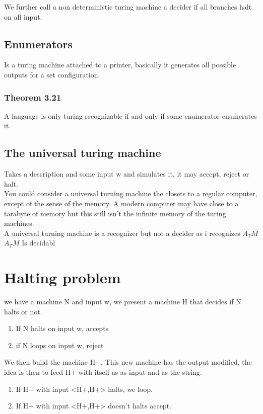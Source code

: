 \documentclass[a4paper,10pt,titlepage]{report}
\begin{document}
We further call a non deterministic turing machine a decider if all branches halt on all input.

\subsection{Enumerators}

Is a turing machine attached to a printer, basically it generates all possible outputs for a set configuration.

\subsubsection{Theorem 3.21}
A language is only turing recognizable if and only if some enumerator enumerates it.

\subsection{The universal turing machine}
Takes a description and some input w and simulates it, it may accept, reject or halt.\\

You could consider a universal turning machine the closets to a regular computer, except of the sense of the memory. A modern computer may have close to a tarabyte of memory but this still isn't the infinite memory of the turing machines.\\

A universal turning machine is a recognizer but not a decider as i recognizes $A_TM$\\


$A_TM $ Is decidabl


\section{Halting problem}
we have a machine N and input w, we present a machine H that decides if N halts or not.\\
\begin{enumerate}
\item If N halts on input w, accepts
\item if N loops on input w, reject
\end{enumerate}
We then build the machine H+, This new machine has the output modified, the idea is then to feed H+ with itself as as input and as the string.
\begin{enumerate}
\item If H+ with input <H+,H+> halts, we loop.
\item If H+ with input <H+,H+> doesn't halts accept.
\end{enumerate}
\end{document}
